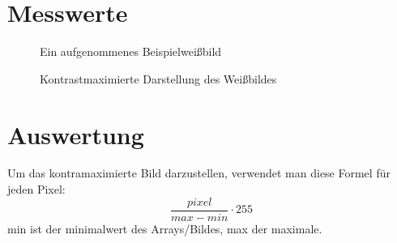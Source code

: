 \documentclass[12pt, oneside, a4paper, \docLanguage]{report}
\begin{document}
\section{Messwerte}
\label{chap:VERSUCH_3_MESSWERTE}
\begin{figure}[H]
\centering\small
{}
	\caption{Ein aufgenommenes Beispielweißbild}
\end{figure}
\begin{figure}[H]
\centering\small
{}
	\caption{Kontrastmaximierte Darstellung des Weißbildes}
\end{figure}
\section{Auswertung}
\label{chap:VERSUCH_3_AUSWERTUNG}
Um das kontramaximierte Bild darzustellen, verwendet man diese Formel für jeden Pixel:
	$$\frac{pixel}{max-min}\cdot255$$
	min ist der minimalwert des Arrays/Bildes, max der maximale.
	
\end{document}
